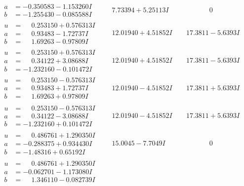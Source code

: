 \documentclass[1p]{elsarticle_modified}
\theoremstyle{definition}
\begin{document}
$$\begin{array}{c|c|c}
\begin{aligned}
a &= -0.350583 - 1.153260 I \\
b &= -1.255430 - 0.085588 I\end{aligned}
 & \phantom{-}7.73394 + 5.25113 I & \phantom{-0.000000 } 0 \\ \hline\begin{aligned}
u &= \phantom{-}0.253150 + 0.576313 I \\
a &= \phantom{-}0.93483 - 1.72737 I \\
b &= \phantom{-}1.69263 - 0.97809 I\end{aligned}
 & \phantom{-}12.01940 + 4.51852 I & \phantom{-}17.3811 - 5.6393 I \\ \hline\begin{aligned}
u &= \phantom{-}0.253150 + 0.576313 I \\
a &= \phantom{-}0.34122 + 3.08688 I \\
b &= -1.232160 - 0.101472 I\end{aligned}
 & \phantom{-}12.01940 + 4.51852 I & \phantom{-}17.3811 - 5.6393 I \\ \hline\begin{aligned}
u &= \phantom{-}0.253150 - 0.576313 I \\
a &= \phantom{-}0.93483 + 1.72737 I \\
b &= \phantom{-}1.69263 + 0.97809 I\end{aligned}
 & \phantom{-}12.01940 - 4.51852 I & \phantom{-}17.3811 + 5.6393 I \\ \hline\begin{aligned}
u &= \phantom{-}0.253150 - 0.576313 I \\
a &= \phantom{-}0.34122 - 3.08688 I \\
b &= -1.232160 + 0.101472 I\end{aligned}
 & \phantom{-}12.01940 - 4.51852 I & \phantom{-}17.3811 + 5.6393 I \\ \hline\begin{aligned}
u &= \phantom{-}0.486761 + 1.290350 I \\
a &= -0.288375 + 0.934430 I \\
b &= -1.48316 + 0.65192 I\end{aligned}
 & \phantom{-}15.0045 - 7.7049 I & \phantom{-0.000000 } 0 \\ \hline\begin{aligned}
u &= \phantom{-}0.486761 + 1.290350 I \\
a &= -0.062701 - 1.173080 I \\
b &= \phantom{-}1.346110 - 0.082739 I\end{aligned}

\end{array}$$
\end{document}
